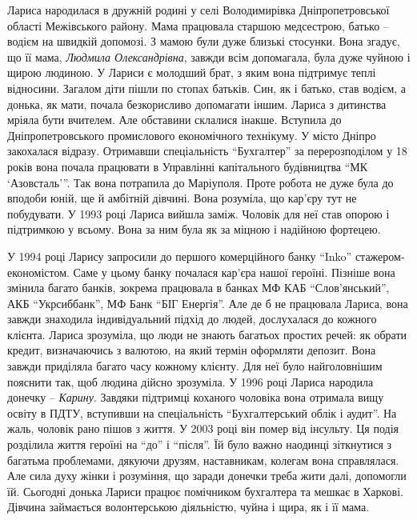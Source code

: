 Лариса народилася в дружній родині у селі Володимирівка Дніпропетровської
області Межівського району. Мама працювала старшою медсестрою, батько – водієм
на швидкій допомозі. З мамою були дуже близькі стосунки. Вона згадує, що її
мама, \emph{Людмила Олександрівна}, завжди всім допомагала, була дуже чуйною і щирою
людиною. У Лариси є молодший брат, з яким вона підтримує теплі відносини.
Загалом діти пішли по стопах батьків. Син, як і батько, став водієм, а донька,
як мати, почала безкорисливо допомагати іншим. Лариса з дитинства мріяла бути
вчителем. Але обставини склалися інакше. Вступила до Дніпропетровського
промислового економічного технікуму. У місто Дніпро закохалася відразу.
Отримавши спеціальність \enquote{Бухгалтер} за перерозподілом у 18 років вона почала
працювати в Управлінні капітального будівництва \enquote{МК \enquote{Азовсталь}}. Так вона
потрапила до Маріуполя. Проте робота не дуже була до вподоби юній, ще й
амбітній дівчині. Вона розуміла, що кар'єру тут не побудувати. У 1993 році
Лариса вийшла заміж. Чоловік для неї став опорою і підтримкою у всьому. Вона за
ним була як за міцною і надійною фортецею.


У 1994 році Ларису запросили до першого комерційного банку \enquote{Inko}
стажером-економістом. Саме у цьому банку почалася кар'єра нашої героїні.
Пізніше вона змінила багато банків, зокрема працювала в банках МФ КАБ
\enquote{Слов'янський}, АКБ \enquote{Укрсиббанк}, МФ Банк \enquote{БІГ Енергія}. Але де б не працювала
Лариса, вона завжди знаходила індивідуальний підхід до людей, дослухалася до
кожного клієнта. Лариса зрозуміла, що люди не знають багатьох простих речей: як
обрати кредит, визначаючись з валютою, на який термін оформляти депозит. Вона
завжди приділяла багато часу кожному клієнту. Для неї було найголовнішим
пояснити так, щоб людина дійсно зрозуміла. У 1996 році Лариса народила донечку
– \emph{Карину}. Завдяки підтримці коханого чоловіка вона отримала вищу освіту в ПДТУ,
вступивши на спеціальність \enquote{Бухгалтерський облік і аудит}. На жаль, чоловік
рано пішов з життя. У 2003 році він помер від інсульту. Ця подія розділила
життя героїні на \enquote{до} і \enquote{після}. Їй було важно наодинці зіткнутися з багатьма
проблемами, дякуючи друзям, наставникам, колегам вона справлялася. Але сила
духу жінки і розуміння, що заради донечки треба жити далі, допомогли їй.
Сьогодні донька Лариси працює помічником бухгалтера та мешкає в Харкові.
Дівчина займається волонтерською діяльністю, чуйна і щира, як і її мама.

